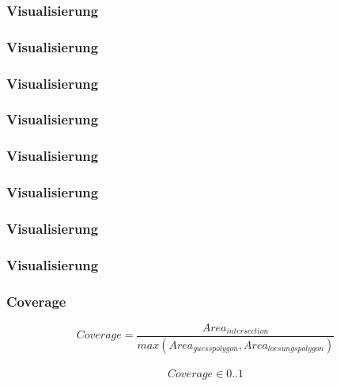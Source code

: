 \begin{frame}[fragile]
  \frametitle{Visualisierung}
  \lstset{language=XML,basicstyle=\tiny}
  
\end{frame}

\begin{frame}
  \frametitle{Visualisierung}
\end{frame}

\begin{frame}
  \frametitle{Visualisierung}
\end{frame}

\begin{frame}
  \frametitle{Visualisierung}
\end{frame}

\begin{frame}
  \frametitle{Visualisierung}
\end{frame}

\begin{frame}
  \frametitle{Visualisierung}
\end{frame}

\begin{frame}
  \frametitle{Visualisierung}
\end{frame}

\begin{frame}
  \frametitle{Visualisierung}
\end{frame}

\begin{frame}
  \frametitle{Coverage}
  \begin{equation*}
    Coverage = \frac{Area_{intersection}}{max(Area_{guesspolygon},Area_{loesungspolygon})}
  \end{equation*}
\\
  \begin{equation*}
    Coverage \in {0..1}
  \end{equation*}
\end{frame}

